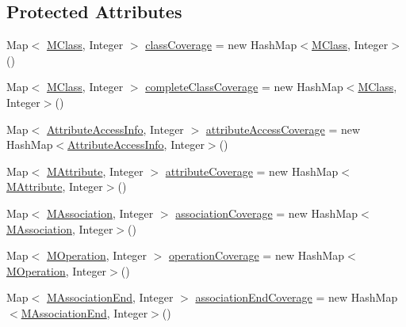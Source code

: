 \subsection*{Protected Attributes}
\begin{DoxyCompactItemize}
\item 
Map$<$ \hyperlink{interfaceorg_1_1tzi_1_1use_1_1uml_1_1mm_1_1_m_class}{M\-Class}, Integer $>$ \hyperlink{classorg_1_1tzi_1_1use_1_1analysis_1_1coverage_1_1_coverage_data_a2c12dd4e26ecc1eab266e709d5cb1761}{class\-Coverage} = new Hash\-Map$<$\hyperlink{interfaceorg_1_1tzi_1_1use_1_1uml_1_1mm_1_1_m_class}{M\-Class}, Integer$>$()
\item 
Map$<$ \hyperlink{interfaceorg_1_1tzi_1_1use_1_1uml_1_1mm_1_1_m_class}{M\-Class}, Integer $>$ \hyperlink{classorg_1_1tzi_1_1use_1_1analysis_1_1coverage_1_1_coverage_data_a6ebec40e9045adddb05a44d8acb53070}{complete\-Class\-Coverage} = new Hash\-Map$<$\hyperlink{interfaceorg_1_1tzi_1_1use_1_1uml_1_1mm_1_1_m_class}{M\-Class}, Integer$>$()
\item 
Map$<$ \hyperlink{classorg_1_1tzi_1_1use_1_1analysis_1_1coverage_1_1_attribute_access_info}{Attribute\-Access\-Info}, Integer $>$ \hyperlink{classorg_1_1tzi_1_1use_1_1analysis_1_1coverage_1_1_coverage_data_aae7aeb807c41253c9f0491ea2fa2f035}{attribute\-Access\-Coverage} = new Hash\-Map$<$\hyperlink{classorg_1_1tzi_1_1use_1_1analysis_1_1coverage_1_1_attribute_access_info}{Attribute\-Access\-Info}, Integer$>$()
\item 
Map$<$ \hyperlink{classorg_1_1tzi_1_1use_1_1uml_1_1mm_1_1_m_attribute}{M\-Attribute}, Integer $>$ \hyperlink{classorg_1_1tzi_1_1use_1_1analysis_1_1coverage_1_1_coverage_data_ab16587c58b3ae78ad31f55e6c8856492}{attribute\-Coverage} = new Hash\-Map$<$\hyperlink{classorg_1_1tzi_1_1use_1_1uml_1_1mm_1_1_m_attribute}{M\-Attribute}, Integer$>$()
\item 
Map$<$ \hyperlink{interfaceorg_1_1tzi_1_1use_1_1uml_1_1mm_1_1_m_association}{M\-Association}, Integer $>$ \hyperlink{classorg_1_1tzi_1_1use_1_1analysis_1_1coverage_1_1_coverage_data_aeceb4250fb1a846e526d1fa1de5bdfd2}{association\-Coverage} = new Hash\-Map$<$\hyperlink{interfaceorg_1_1tzi_1_1use_1_1uml_1_1mm_1_1_m_association}{M\-Association}, Integer$>$()
\item 
Map$<$ \hyperlink{classorg_1_1tzi_1_1use_1_1uml_1_1mm_1_1_m_operation}{M\-Operation}, Integer $>$ \hyperlink{classorg_1_1tzi_1_1use_1_1analysis_1_1coverage_1_1_coverage_data_a4bbfa0429081023f87fb921b33823450}{operation\-Coverage} = new Hash\-Map$<$\hyperlink{classorg_1_1tzi_1_1use_1_1uml_1_1mm_1_1_m_operation}{M\-Operation}, Integer$>$()
\item 
Map$<$ \hyperlink{classorg_1_1tzi_1_1use_1_1uml_1_1mm_1_1_m_association_end}{M\-Association\-End}, Integer $>$ \hyperlink{classorg_1_1tzi_1_1use_1_1analysis_1_1coverage_1_1_coverage_data_af50ffec81097e034e59fff02fe66e1d4}{association\-End\-Coverage} = new Hash\-Map$<$\hyperlink{classorg_1_1tzi_1_1use_1_1uml_1_1mm_1_1_m_association_end}{M\-Association\-End}, Integer$>$()
\end{DoxyCompactItemize}


